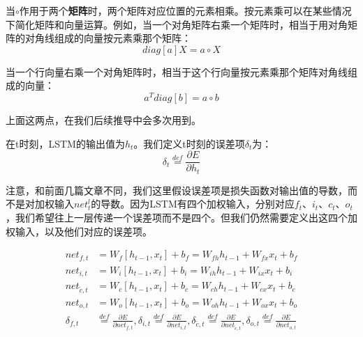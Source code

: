 当\(\circ\)作用于两个\textbf{矩阵}时，两个矩阵对应位置的元素相乘。按元素乘可以在某些情况下简化矩阵和向量运算。例如，当一个对角矩阵右乘一个矩阵时，相当于用对角矩阵的对角线组成的向量按元素乘那个矩阵：
\[
	diag[{a}]X={a}\circ X
\]

当一个行向量右乘一个对角矩阵时，相当于这个行向量按元素乘那个矩阵对角线组成的向量：
\[
	{a}^Tdiag[{b}]={a}\circ{b}
\]

上面这两点，在我们后续推导中会多次用到。

在t时刻，LSTM的输出值为\({h}_t\)。我们定义t时刻的误差项\(\delta_t\)为：
\[
	\delta_t\overset{def}{=}\frac{\partial{E}}{\partial{{h}_t}}
\]

注意，和前面几篇文章不同，我们这里假设误差项是损失函数对输出值的导数，而不是对加权输入\(net_t^l\)的导数。因为LSTM有四个加权输入，分别对应\({f}_t\)、\({i}_t\)、\({c}_t\)、\({o}_t\)，我们希望往上一层传递一个误差项而不是四个。但我们仍然需要定义出这四个加权输入，以及他们对应的误差项。

\begin{align*}
	{net}_{f,t}         & =W_f[{h}_{t-1},{x}_t]+{b}_f=W_{fh}{h}_{t-1}+W_{fx}{x}_t+{b}_f                                                                                                                                                                                                                                  \\
	{net}_{i,t}         & =W_i[{h}_{t-1},{x}_t]+{b}_i=W_{ih}{h}_{t-1}+W_{ix}{x}_t+{b}_i                                                                                                                                                                                                                                  \\
	{net}_{\tilde{c},t} & =W_c[{h}_{t-1},{x}_t]+{b}_c=W_{ch}{h}_{t-1}+W_{cx}{x}_t+{b}_c                                                                                                                                                                                                                                  \\
	{net}_{o,t}         & =W_o[{h}_{t-1},{x}_t]+{b}_o=W_{oh}{h}_{t-1}+W_{ox}{x}_t+{b}_o                                                                                                                                                                                                                                  \\
	\delta_{f,t}        & \overset{def}{=}\frac{\partial{E}}{\partial{{net}_{f,t}}}, \delta_{i,t}\overset{def}{=}\frac{\partial{E}}{\partial{{net}_{i,t}}}, \delta_{\tilde{c},t}\overset{def}{=}\frac{\partial{E}}{\partial{{net}_{\tilde{c},t}}}, \delta_{o,t}\overset{def}{=}\frac{\partial{E}}{\partial{{net}_{o,t}}}
\end{align*}

